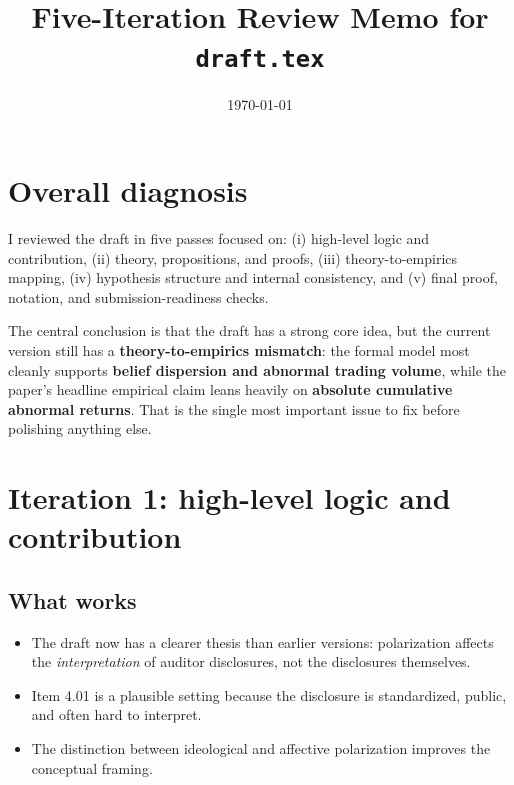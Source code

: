 \documentclass[12pt]{article}
\title{Five-Iteration Review Memo for \texttt{draft.tex}}
\author{}
\date{\today}
\begin{document}
\maketitle

\section*{Overall diagnosis}
I reviewed the draft in five passes focused on: (i) high-level logic and contribution, (ii) theory, propositions, and proofs, (iii) theory-to-empirics mapping, (iv) hypothesis structure and internal consistency, and (v) final proof, notation, and submission-readiness checks.

The central conclusion is that the draft has a strong core idea, but the current version still has a \textbf{theory-to-empirics mismatch}: the formal model most cleanly supports \textbf{belief dispersion and abnormal trading volume}, while the paper's headline empirical claim leans heavily on \textbf{absolute cumulative abnormal returns}. That is the single most important issue to fix before polishing anything else.

\section*{Iteration 1: high-level logic and contribution}

\subsection*{What works}
\begin{itemize}[leftmargin=1.5em]
    \item The draft now has a clearer thesis than earlier versions: polarization affects the \emph{interpretation} of auditor disclosures, not the disclosures themselves.
    \item Item 4.01 is a plausible setting because the disclosure is standardized, public, and often hard to interpret.
    \item The distinction between ideological and affective polarization improves the conceptual framing.
\end{itemize}
\end{document}
